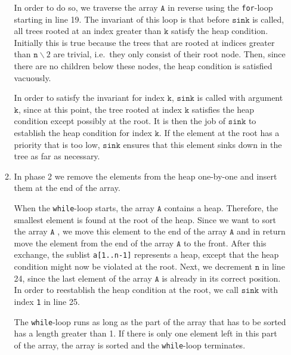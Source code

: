 \begin{enumerate}
\begin{enumerate}
            In order to do so, we traverse the array $\texttt{A}$ in reverse using the
            \texttt{for}-loop starting in line 19.  The invariant of this loop is that before
            $\texttt{sink}$ is called, all trees rooted at an index greater than
            $\texttt{k}$ satisfy the heap condition.  Initially this is true because the trees that
            are rooted at indices greater than $\texttt{n}\backslash 2$ are trivial, i.e.~they only
            consist of their root node.  Then, since there are no children below these nodes, the heap
            condition is satisfied vacuously. 
            
            In order to satisfy the invariant for index $\texttt{k}$, $\texttt{sink}$ is called with
            argument $\texttt{k}$,  since at this point, the tree rooted at index $\texttt{k}$ satisfies
            the heap condition except possibly at the root.  It is then the job of $\texttt{sink}$ to
            establish the heap condition for index $\texttt{k}$.  If the element at the root has a
            priority that is too low, $\texttt{sink}$ ensures that this element sinks down in the tree
            as far as necessary.
      \item In phase 2 we remove the elements from the heap one-by-one and insert them at the end of
            the array.

            When the \texttt{while}-loop starts, the array $\texttt{A}$ contains a heap.  Therefore,
            the smallest element is found at the root of the heap.  Since we want to sort the
            array $\texttt{A}$ , we move this element to the end of the array $\texttt{A}$ and in
            return move the element from the end of the array $\texttt{A}$ to the front.
            After this exchange, the sublist \texttt{a[1..n-1]} represents a heap, except that the
            heap condition might now be violated at the root.  Next, we decrement $\texttt{n}$ in line 24, since the
            last element of the array $\texttt{A}$ is already in its correct position.  
            In order to reestablish the heap condition at the root, we call $\texttt{sink}$ with index
            \texttt{1} in line 25.

            The \texttt{while}-loop runs as long as the part of the array that has to be sorted has
            a length greater than 1.  If there is only one element left in this part of the array, the array is
            sorted and the \texttt{while}-loop terminates.
      \end{enumerate}
\end{enumerate}

